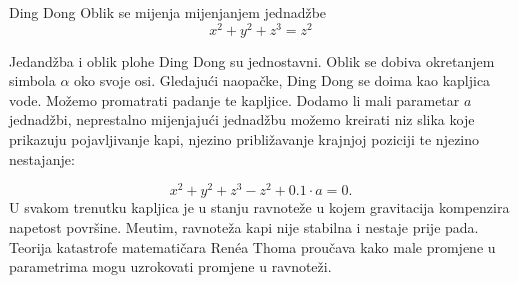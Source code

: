 \begin{surferPage}{Ding Dong}
Oblik se mijenja mijenjanjem jednad\v{z}be\\

\smallskip
\[x^2	+ y^2	+ z^3	= z^2\]

\singlespacing
Jedand\v{z}ba i oblik plohe Ding Dong su jednostavni. Oblik se dobiva okretanjem simbola $\alpha$ oko svoje osi.
Gledaju\'{c}i naopa\v{c}ke, Ding Dong se doima kao kapljica vode. Mo\v{z}emo promatrati padanje te kapljice.
\newline
Dodamo li mali parametar $a$ jednad\v{z}bi, neprestalno mijenjaju\'{c}i jednad\v{z}bu mo\v{z}emo kreirati niz slika koje prikazuju pojavljivanje kapi, njezino pribli\v{z}avanje krajnjoj poziciji te njezino nestajanje:

\[x^2	+ y^2	+ z^3	-z^2+0.1\cdot a=0.\]
U svakom trenutku kapljica je u stanju ravnote\v{z}e u kojem gravitacija kompenzira napetost povr\v{s}ine. Me\dj{}utim, ravnote\v{z}a kapi nije stabilna i nestaje prije pada. Teorija katastrofe matemati\v{c}ara Ren\'ea Thoma prou\v{c}ava kako male promjene u parametrima mogu uzrokovati promjene u ravnote\v{z}i.
\end{surferPage}
